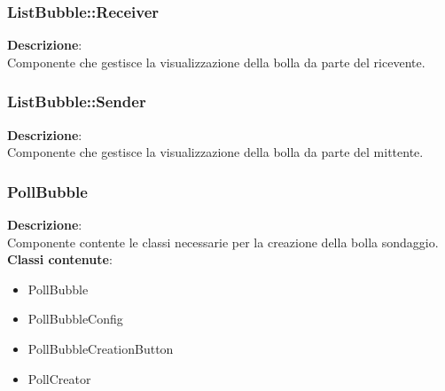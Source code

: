 \clearpage

\subsubsection{ListBubble::Receiver}
\textbf{Descrizione}:\\
 Componente che gestisce la visualizzazione della bolla da parte del ricevente. 


\clearpage

\subsubsection{ListBubble::Sender}
\textbf{Descrizione}:\\
 Componente che gestisce la visualizzazione della bolla da parte del mittente. 


\clearpage

\subsubsection{PollBubble}
   \FloatBarrier
\FloatBarrier
\textbf{Descrizione}:\\
 Componente contente le classi necessarie per la creazione della bolla sondaggio. 
\\ \textbf{Classi contenute}:\\
\begin{itemize}
\item PollBubble
\item PollBubbleConfig
\item PollBubbleCreationButton
\item PollCreator
\end{itemize}


